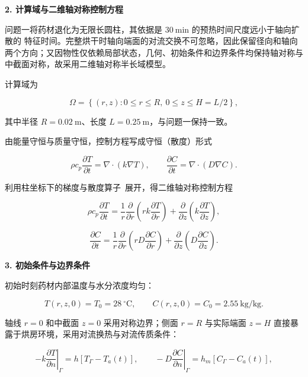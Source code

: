 \documentclass[12pt,a4paper]{ctexart}
\begin{document}
\textbf{2. 计算域与二维轴对称控制方程}

问题一将药材退化为无限长圆柱，其依据是 $30\ \mathrm{min}$ 的预热时间尺度远小于轴向扩散的
特征时间。完整烘干时轴向端面的对流交换不可忽略，因此保留径向和轴向两个方向；又因物性仅依赖局部状态，几何、初始条件和边界条件均保持轴对称与中截面对称，故采用二维轴对称半长域模型。

计算域为

\begin{equation}
\Omega=\left\{(r,z):0\le r\le R,\ 0\le z\le H=L/2\right\},
\label{eq:p2domain}
\end{equation}

其中半径 $R=0.02\ \mathrm{m}$、长度 $L=0.25\ \mathrm{m}$，与问题一保持一致。

由能量守恒与质量守恒，控制方程写成守恒（散度）形式

\begin{equation}
\rho c_p\frac{\partial T}{\partial t}=\nabla\cdot(k\nabla T),
\qquad
\frac{\partial C}{\partial t}=\nabla\cdot(D\nabla C).
\label{eq:p2governing}
\end{equation}

利用柱坐标下的梯度与散度算子~\cite{ref2}展开，得二维轴对称控制方程

\begin{equation}
\rho c_p\frac{\partial T}{\partial t}
=\frac{1}{r}\frac{\partial}{\partial r}\!\left(rk\frac{\partial T}{\partial r}\right)
+\frac{\partial}{\partial z}\!\left(k\frac{\partial T}{\partial z}\right),
\label{eq:p2heat}
\end{equation}

\begin{equation}
\frac{\partial C}{\partial t}
=\frac{1}{r}\frac{\partial}{\partial r}\!\left(rD\frac{\partial C}{\partial r}\right)
+\frac{\partial}{\partial z}\!\left(D\frac{\partial C}{\partial z}\right).
\label{eq:p2mass}
\end{equation}

\textbf{3. 初始条件与边界条件}

初始时刻药材内部温度与水分浓度均匀：

\begin{equation}
T(r,z,0)=T_0=28\ ^\circ\mathrm{C},\qquad
C(r,z,0)=C_0=2.55\ \mathrm{kg/kg}.
\label{eq:p2ic}
\end{equation}

轴线 $r=0$ 和中截面 $z=0$ 采用对称边界；侧面 $r=R$ 与实际端面 $z=H$ 直接暴露于烘房环境，采用对流换热与对流传质条件：

\begin{equation}
-k\left.\frac{\partial T}{\partial n}\right|_{\Gamma}=h\left[T_{\Gamma}-T_a(t)\right],
\qquad
-D\left.\frac{\partial C}{\partial n}\right|_{\Gamma}=h_m\left[C_{\Gamma}-C_a(t)\right],
\label{eq:p2bc}
\end{equation}
\end{document}
